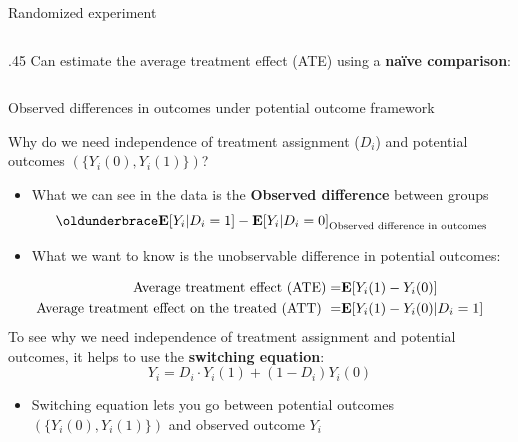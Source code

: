 \begin{frame}{Randomized experiment}
\begin{columns}
\begin{column}{.45\textwidth}
\vspace{2ex}
Can estimate the average treatment effect (ATE) using a \textbf{na{\"i}ve comparison}: 
\begin{itemize}
\end{itemize}

\end{column}
\end{columns}
\end{frame}

\begin{frame}{Observed differences in outcomes under potential outcome framework}

Why do we need independence of treatment assignment ($D_i$) and potential outcomes $\left( \{Y_i (0), Y_i (1)\}\right)$?
\begin{itemize}
    \item What we can see in the data is the \textbf{Observed difference} between groups
\begin{equation*}
    \underbrace{\EE [Y_i \vert D_i = 1] - \EE [Y_i \vert D_i = 0]}_{\text{Observed difference in outcomes}}
\end{equation*}
    \item What we want to know is the unobservable difference in potential outcomes:
\end{itemize}
\begin{align*}
\text{Average treatment effect (ATE)}  =& \mathbf{E} [Y_i (1) - Y_i (0)] \\
\text{Average treatment effect on the treated (ATT) } =& \mathbf{E} [Y_i (1) - Y_i (0) \vert D_i = 1]
\end{align*}
To see why we need independence of treatment assignment and potential outcomes, it helps to use the \textbf{switching equation}:
\begin{equation*}
Y_i = D_i \cdot Y_i (1) + (1 - D_i) Y_i (0)
\end{equation*}
\begin{itemize}
\item [$\implies$] Switching equation lets you go between potential outcomes $\left( \{Y_i (0), Y_i (1)\}\right)$ and observed outcome $Y_i$
\end{itemize}

\end{frame}

